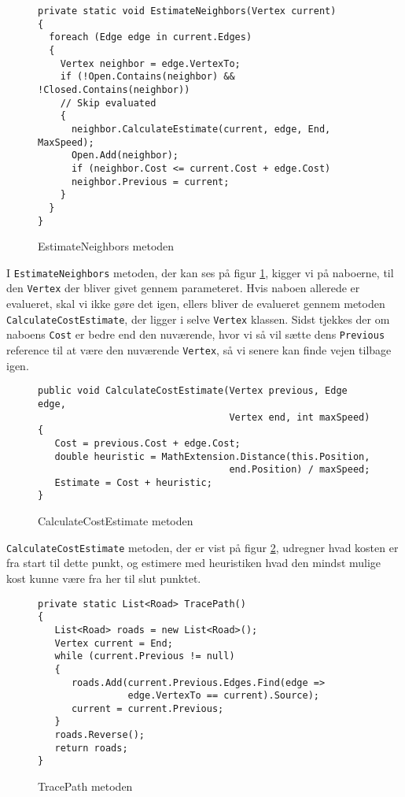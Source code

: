 \begin{figure}[H]
\begin{lstlisting}
private static void EstimateNeighbors(Vertex current)
{
  foreach (Edge edge in current.Edges)
  {
    Vertex neighbor = edge.VertexTo;
    if (!Open.Contains(neighbor) && !Closed.Contains(neighbor)) 
    // Skip evaluated
    {
      neighbor.CalculateEstimate(current, edge, End, MaxSpeed); 
      Open.Add(neighbor);
      if (neighbor.Cost <= current.Cost + edge.Cost) 
      neighbor.Previous = current;
    }
  }
}
\end{lstlisting}
\caption{EstimateNeighbors metoden}\label{EstimateNeighborsCode}
\end{figure}

I \texttt{EstimateNeighbors} metoden, der kan ses på figur \ref{EstimateNeighborsCode}, kigger vi på naboerne, til den \texttt{Vertex} der bliver givet gennem parameteret. Hvis naboen allerede er evalueret, skal vi ikke gøre det igen, ellers bliver de evalueret gennem metoden \texttt{CalculateCostEstimate}, der ligger i selve \texttt{Vertex} klassen. Sidst tjekkes der om naboens \texttt{Cost} er bedre end den nuværende, hvor vi så vil sætte dens \texttt{Previous} reference til at være den nuværende \texttt{Vertex}, så vi senere kan finde vejen tilbage igen.

\begin{figure}[H]
\begin{lstlisting}
public void CalculateCostEstimate(Vertex previous, Edge edge, 
                                  Vertex end, int maxSpeed)
{
   Cost = previous.Cost + edge.Cost;
   double heuristic = MathExtension.Distance(this.Position, 
                                  end.Position) / maxSpeed;
   Estimate = Cost + heuristic;
}
\end{lstlisting}
\caption{CalculateCostEstimate metoden}\label{CalculateCostEstimateCode}
\end{figure}

\texttt{CalculateCostEstimate} metoden, der er vist på figur \ref{CalculateCostEstimateCode}, udregner hvad kosten er fra start til dette punkt, og estimere med heuristiken hvad den mindst mulige kost kunne være fra her til slut punktet.

\begin{figure}[H]
\begin{lstlisting}
private static List<Road> TracePath()
{
   List<Road> roads = new List<Road>();
   Vertex current = End;
   while (current.Previous != null)              
   { 
      roads.Add(current.Previous.Edges.Find(edge => 
                edge.VertexTo == current).Source);
      current = current.Previous;
   }
   roads.Reverse();
   return roads;
}
\end{lstlisting}
\caption{TracePath metoden}\label{TracePathCode}
\end{figure}

